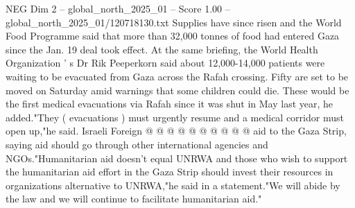 \begin{textsample}{NEG Dim 2 – global\_north\_2025\_01 – Score 1.00 – global\_north\_2025\_01/120718130.txt}
Supplies have since risen and the World Food Programme said that more than 32,000 tonnes of food had entered Gaza since the Jan. 19 deal took effect.
At the same briefing, the World Health Organization ' s Dr Rik Peeperkorn said about 12,000-14,000 patients were waiting to be evacuated from Gaza across the Rafah crossing.
Fifty are set to be moved on Saturday amid warnings that some children could die.
These would be the first medical evacuations via Rafah since it was shut in May last year, he added."They ( evacuations ) must urgently resume and a medical corridor must open up,"he said.
Israeli Foreign @ @ @ @ @ @ @ @ @ @ aid to the Gaza Strip, saying aid should go through other international agencies and NGOs."Humanitarian aid doesn't equal UNRWA and those who wish to support the humanitarian aid effort in the Gaza Strip should invest their resources in organizations alternative to UNRWA,"he said in a statement."We will abide by the law and we will continue to facilitate humanitarian aid."

\end{textsample}
